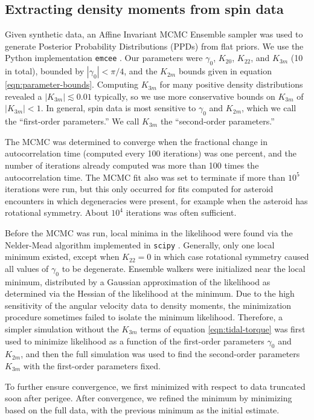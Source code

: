 \documentclass[fleqn,usenatbib]{mnras}
\begin{document}
\subsection{Extracting density moments from spin data}
\label{sec:fit}
Given synthetic data, an Affine Invariant MCMC Ensemble sampler was used to generate Posterior Probability Distributions (PPDs) from flat priors. We use the Python implementation \texttt{emcee} \citep{foreman2013emcee}. Our parameters were $\gamma_0$, $K_{20}$, $K_{22}$, and $K_{3m}$ (10 in total), bounded by $|\gamma_0| < \pi/4$, and the $K_{2 m}$ bounds given in equation \ref{eqn:parameter-bounds}. Computing $K_{3m}$ for many positive density distributions revealed a $|K_{3m}| \lesssim 0.01$ typically, so we use more conservative bounds on $K_{3 m}$ of $|K_{3 m}| < 1$. In general, spin data is most sensitive to $\gamma_0$ and $K_{2m}$, which we call the ``first-order parameters.'' We call $K_{3m}$ the ``second-order parameters.''

The MCMC was determined to converge when the fractional change in autocorrelation time (computed every 100 iterations) was one percent, and the number of iterations already computed was more than 100 times the autocorrelation time. The MCMC fit also was set to terminate if more than $10^5$ iterations were run, but this only occurred for fits computed for asteroid encounters in which degeneracies were present, for example when the asteroid has rotational symmetry. About $10^4$ iterations was often sufficient.

Before the MCMC was run, local minima in the likelihood were found via the Nelder-Mead algorithm implemented in \texttt{scipy} \citep{Gao2012}. Generally, only one local minimum existed, except when $K_{22}=0$ in which case rotational symmetry caused all values of $\gamma_0$ to be degenerate. Ensemble walkers were initialized near the local minimum, distributed by a Gaussian approximation of the likelihood as determined via the Hessian of the likelihood at the minimum. Due to the high sensitivity of the angular velocity data to density moments, the minimization procedure sometimes failed to isolate the minimum likelihood. Therefore, a simpler simulation without the $K_{3m}$ terms of equation \ref{eqn:tidal-torque} was first used to minimize likelihood as a function of the first-order parameters $\gamma_0$ and $K_{2m}$, and then the full simulation was used to find the second-order parameters $K_{3m}$ with the first-order parameters fixed.

To further ensure convergence, we first minimized with respect to data truncated soon after perigee. After convergence, we refined the minimum by minimizing based on the full data, with the previous minimum as the initial estimate.
\end{document}
